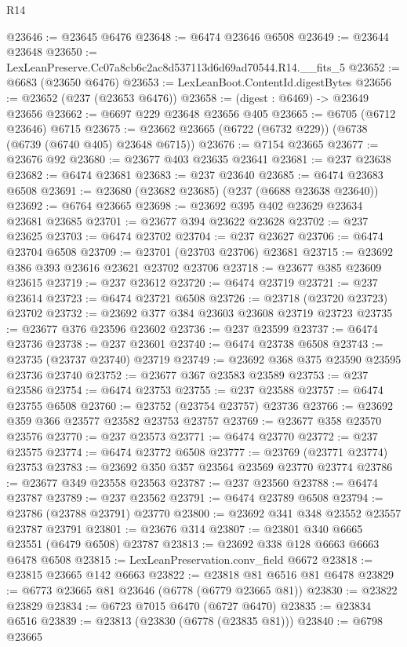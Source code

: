 \begin{lexlean}{R14}
\begin{coremodule}
@23646 := @23645 @6476
@23648 := @6474 @23646 @6508
@23649 := @23644 @23648
@23650 := LexLeanPreserve.Cc07a8cb6c2ac8d537113d6d69ad70544.R14.__fits_5
@23652 := @6683 (@23650 @6476)
@23653 := LexLeanBoot.ContentId.digestBytes
@23656 := @23652 (@237 (@23653 @6476))
@23658 := (digest : @6469) -> @23649 @23656
@23662 := @6697 @229 @23648 @23656 @405
@23665 := @6705 (@6712 @23646) @6715
@23675 := @23662 @23665 (@6722 (@6732 @229)) (@6738 (@6739 (@6740 @405) @23648 @6715))
@23676 := @7154 @23665
@23677 := @23676 @92
@23680 := @23677 @403 @23635 @23641
@23681 := @237 @23638
@23682 := @6474 @23681
@23683 := @237 @23640
@23685 := @6474 @23683 @6508
@23691 := @23680 (@23682 @23685) (@237 (@6688 @23638 @23640))
@23692 := @6764 @23665
@23698 := @23692 @395 @402 @23629 @23634 @23681 @23685
@23701 := @23677 @394 @23622 @23628
@23702 := @237 @23625
@23703 := @6474 @23702
@23704 := @237 @23627
@23706 := @6474 @23704 @6508
@23709 := @23701 (@23703 @23706) @23681
@23715 := @23692 @386 @393 @23616 @23621 @23702 @23706
@23718 := @23677 @385 @23609 @23615
@23719 := @237 @23612
@23720 := @6474 @23719
@23721 := @237 @23614
@23723 := @6474 @23721 @6508
@23726 := @23718 (@23720 @23723) @23702
@23732 := @23692 @377 @384 @23603 @23608 @23719 @23723
@23735 := @23677 @376 @23596 @23602
@23736 := @237 @23599
@23737 := @6474 @23736
@23738 := @237 @23601
@23740 := @6474 @23738 @6508
@23743 := @23735 (@23737 @23740) @23719
@23749 := @23692 @368 @375 @23590 @23595 @23736 @23740
@23752 := @23677 @367 @23583 @23589
@23753 := @237 @23586
@23754 := @6474 @23753
@23755 := @237 @23588
@23757 := @6474 @23755 @6508
@23760 := @23752 (@23754 @23757) @23736
@23766 := @23692 @359 @366 @23577 @23582 @23753 @23757
@23769 := @23677 @358 @23570 @23576
@23770 := @237 @23573
@23771 := @6474 @23770
@23772 := @237 @23575
@23774 := @6474 @23772 @6508
@23777 := @23769 (@23771 @23774) @23753
@23783 := @23692 @350 @357 @23564 @23569 @23770 @23774
@23786 := @23677 @349 @23558 @23563
@23787 := @237 @23560
@23788 := @6474 @23787
@23789 := @237 @23562
@23791 := @6474 @23789 @6508
@23794 := @23786 (@23788 @23791) @23770
@23800 := @23692 @341 @348 @23552 @23557 @23787 @23791
@23801 := @23676 @314
@23807 := @23801 @340 @6665 @23551 (@6479 @6508) @23787
@23813 := @23692 @338 @128 @6663 @6663 @6478 @6508
@23815 := LexLeanPreservation.conv_field @6672
@23818 := @23815 @23665 @142 @6663
@23822 := @23818 @81 @6516 @81 @6478
@23829 := @6773 @23665 @81 @23646 (@6778 (@6779 @23665 @81))
@23830 := @23822 @23829
@23834 := @6723 @7015 @6470 (@6727 @6470)
@23835 := @23834 @6516
@23839 := @23813 (@23830 (@6778 (@23835 @81)))
@23840 := @6798 @23665

\end{coremodule}
\end{lexlean}
